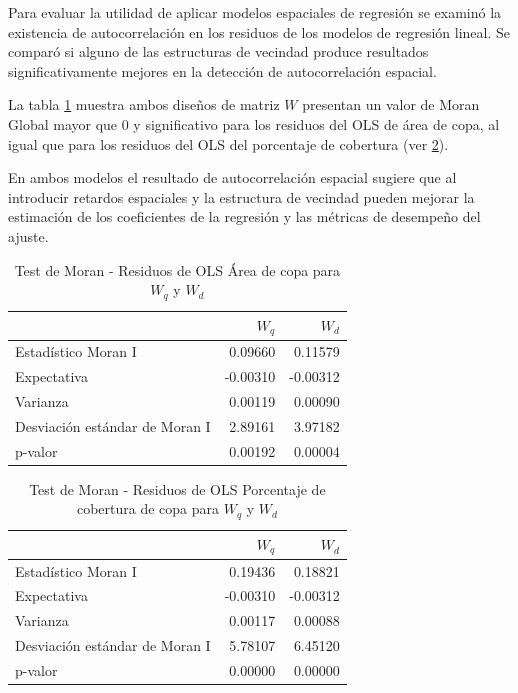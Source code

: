 \documentclass[12pt,a4paper,openany]{book}
\theoremstyle{definition}
\theoremstyle{definition}
\theoremstyle{definition}
\theoremstyle{remark}
\begin{document}
Para evaluar la utilidad de aplicar modelos espaciales de regresión se
examinó la existencia de autocorrelación en los residuos de los modelos
de regresión lineal. Se comparó si alguno de las estructuras de vecindad
produce resultados significativamente mejores en la detección de
autocorrelación espacial.

La tabla \ref{tab:moran-rescopa-w} muestra ambos diseños de matriz \(W\)
presentan un valor de Moran Global mayor que 0 y significativo para los
residuos del OLS de área de copa, al igual que para los residuos del OLS
del porcentaje de cobertura (ver \ref{tab:moran-rescopaap-w}).

En ambos modelos el resultado de autocorrelación espacial sugiere que al
introducir retardos espaciales y la estructura de vecindad pueden
mejorar la estimación de los coeficientes de la regresión y las métricas
de desempeño del ajuste.

\begin{table}[t]

\caption{\label{tab:moran-rescopa-w}Test de Moran - Residuos de OLS Área de copa para $W_q$ y $W_d$}
\centering
\begin{tabular}{lrr}
\toprule
  & $W_q$ & $W_d$\\
\midrule
Estadístico Moran I & 0.09660 & 0.11579\\
Expectativa & -0.00310 & -0.00312\\
Varianza & 0.00119 & 0.00090\\
Desviación estándar de Moran I & 2.89161 & 3.97182\\
p-valor & 0.00192 & 0.00004\\
\bottomrule
\end{tabular}
\end{table}

\begin{table}[t]

\caption{\label{tab:moran-rescopaap-w}Test de Moran - Residuos de OLS Porcentaje de cobertura de copa para $W_q$ y $W_d$}
\centering
\begin{tabular}{lrr}
\toprule
  & $W_q$ & $W_d$\\
\midrule
Estadístico Moran I & 0.19436 & 0.18821\\
Expectativa & -0.00310 & -0.00312\\
Varianza & 0.00117 & 0.00088\\
Desviación estándar de Moran I & 5.78107 & 6.45120\\
p-valor & 0.00000 & 0.00000\\
\bottomrule
\end{tabular}
\end{table}
\end{document}
